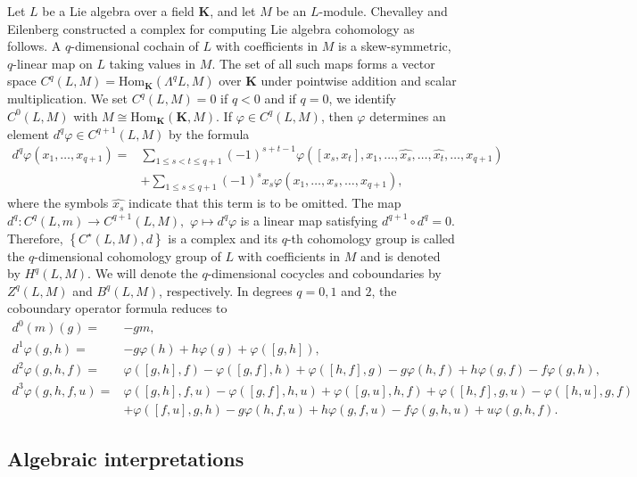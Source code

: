 \documentclass[11pt, twoside]{article}
\begin{document}
Let $L$ be a Lie algebra over a field $\mathbf{K} $, and let $M$ be an  $L$-module. Chevalley and Eilenberg constructed a complex for computing Lie algebra cohomology as follows. A $q$-dimensional cochain of $L$ with coefficients in $M$ is a skew-symmetric, $q$-linear map on $L$ taking values in $M$. The set of all such maps forms a vector space $C^q(L,M)= \mathrm{Hom}_\mathbf{K}(\Lambda^qL,M) $ over $\mathbf{K}$ under pointwise addition and scalar multiplication. We set $C^q(L,M)=0 $ if $q<0$ and if $q=0 $, we identify $C^0(L,M) $ with $M\cong \mathrm{Hom}_\mathbf{K}(\mathbf{K},M) $. If $\varphi \in C^q(L,M) $, then $\varphi$ determines an element $d^q\varphi\in C^{q+1}(L,M) $ by the formula \begin{align*}
    d^q\varphi(x_1,\ldots,x_{q+1})=& \sum\limits_{1\leq s<t\leq q+1}(-1)^{s+t-1}\varphi([x_s,x_t],x_1,\ldots,\widehat{x_s},\ldots,\widehat{x_t},\ldots,x_{q+1}) \\ & + \sum\limits_{1\leq s\leq q+1} (-1)^sx_s\varphi(x_1,\ldots,\widehat{x_s},\ldots,x_{q+1}) ,
\end{align*}  where the symbols $\widehat{x_s} $ indicate that this term is to be omitted. The map $d^q: C^q(L,m)\to C^{q+1}(L,M),$ $\varphi\mapsto d^q\varphi$ is a linear map  satisfying $d^{q+1}\circ d^q=0 $. Therefore, $\left\{C^\star(L,M),d \right\}$ is a complex and its $q$-th cohomology group is called the $q$-dimensional cohomology group of $L$ with coefficients in $M$ and is denoted by $H^q(L,M) $. We will denote the $q$-dimensional cocycles and coboundaries by $Z^q(L,M) $ and $B^q(L,M) $, respectively. In degrees $q=0,1$ and $2$, the coboundary operator formula reduces to \begin{align*}
    d^0(m)(g) =&-gm ,\\ d^1\varphi(g,h) =& -g\varphi(h)+ h\varphi(g)+\varphi([g,h]), \\ d^2\varphi(g,h,f) =& \varphi([g,h],f)-\varphi([g,f],h)+ \varphi([h,f],g) -g\varphi(h,f)+h\varphi(g,f)-f\varphi(g,h),\\  d^3\varphi(g,h,f,u)=& \varphi([g,h],f,u)-\varphi([g,f],h,u)+ \varphi([g,u],h,f)+\varphi([h,f],g,u)-\varphi([h,u],g,f)\\ & +\varphi([f,u],g,h) - g\varphi(h,f,u)+h\varphi(g,f,u)-f\varphi(g,h,u)+ u\varphi(g,h,f).
\end{align*} 


\subsection{Algebraic interpretations}
\end{document}
